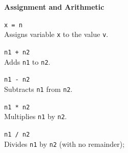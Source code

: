 \documentclass[10pt,twocolumn]{article}
\begin{document}
\bigskip

\balance

\noindent\textbf{\large Assignment and Arithmetic}
\begin{description}

\item{\texttt{x = n}} \ \\[.25em]
  Assigns variable \texttt{x} to the value \texttt{v}.

\item{\texttt{n1 + n2}} \ \\[.25em]
  Adds \texttt{n1} to \texttt{n2}. 

\item{\texttt{n1 - n2}} \ \\[.25em]
  Subtracts \texttt{n1} from \texttt{n2}. 

\item{\texttt{n1 * n2}} \ \\[.25em]
  Multiplies \texttt{n1} by \texttt{n2}. 

\item{\texttt{n1 / n2}} \ \\[.25em]
  Divides \texttt{n1} by \texttt{n2} (with no remainder);
\end{description}
\end{document}
